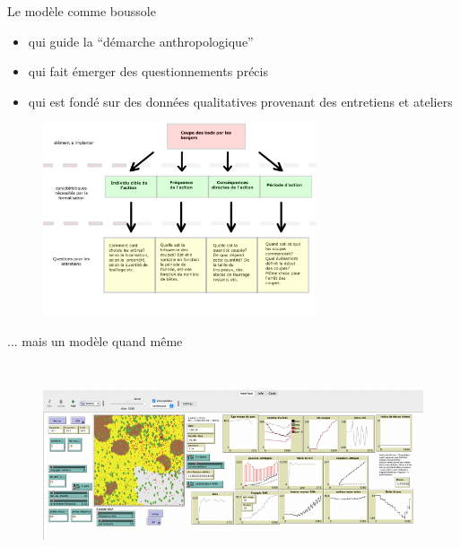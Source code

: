 \documentclass[aspectratio=169]{beamer}
\begin{document}
\begin{frame}{Le modèle  comme boussole}
    \begin{itemize}
        \item qui guide la “démarche anthropologique” 
        \item qui fait émerger des questionnements précis 
        \item qui est fondé sur des données qualitatives provenant des entretiens et ateliers  
    \end{itemize}
    \begin{center}
        \vspace{-1em}
        \begin{figure}
            \centering
            \includegraphics[height = 5.7cm]{img/questionImplementation.png}
        \end{figure}
    \end{center}
\end{frame}

\begin{frame}{... mais un modèle quand même}
    \begin{center}
        \vspace{-1em}
        \begin{figure}
            \centering
            \includegraphics[height = 6cm]{img/ideModele.png}
        \end{figure}
    \end{center}
\end{frame}
\end{document}
